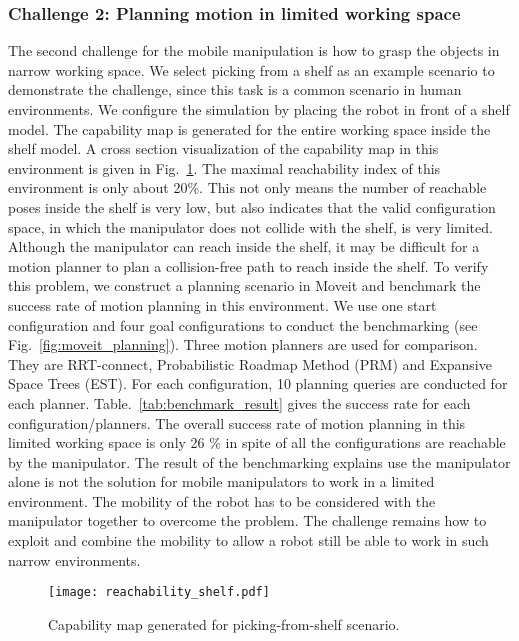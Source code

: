 \subsubsection{Challenge 2: Planning motion in limited working space} 

The second challenge for the mobile manipulation is how to grasp the objects in narrow working space. We select picking from a shelf as an example scenario to demonstrate the challenge, since this task is a common scenario in human environments. We configure the simulation by placing the robot in front of a shelf model. The capability map is generated for the entire working space inside the shelf model. A cross section visualization of the capability map in this environment is given in Fig.~\ref{fig:cmap_shelf}. The maximal reachability index of this environment is only about 20\%. This not only means the number of reachable poses inside the shelf is very low, but also indicates that the valid configuration space, in which the manipulator does not collide with the shelf,  is very limited. Although the manipulator can reach inside the shelf, it may be difficult for a motion planner to plan a collision-free path to reach inside the shelf. To verify this problem, we construct a planning scenario in Moveit \todo{[]}\cite{} and benchmark the success rate of motion planning in this environment. We use one start configuration and four goal configurations to conduct the benchmarking (see Fig.~\ref{fig:moveit_planning}). Three motion planners are used for comparison. They are RRT-connect, Probabilistic Roadmap Method (PRM) and Expansive Space Trees (EST). For each configuration, 10 planning queries are conducted for each planner. Table.~\ref{tab:benchmark_result} gives the success rate for each configuration/planners. The overall success rate of motion planning in this limited working space is only 26 \% in spite of all the configurations are reachable by the manipulator. The result of the benchmarking explains use the manipulator alone is not the solution  for mobile manipulators to work in a limited environment. The mobility of the robot has to be considered with the manipulator together to overcome the problem. The challenge remains how to exploit and combine the mobility to allow a robot still be able to  work in such narrow environments. 

\begin{figure}[!htbp]
\centering
\texttt{[image: reachability\_shelf.pdf]}
\captionsetup{justification=raggedright}
\caption{Capability map generated for picking-from-shelf scenario. }
\label{fig:cmap_shelf}       %
\end{figure} 


